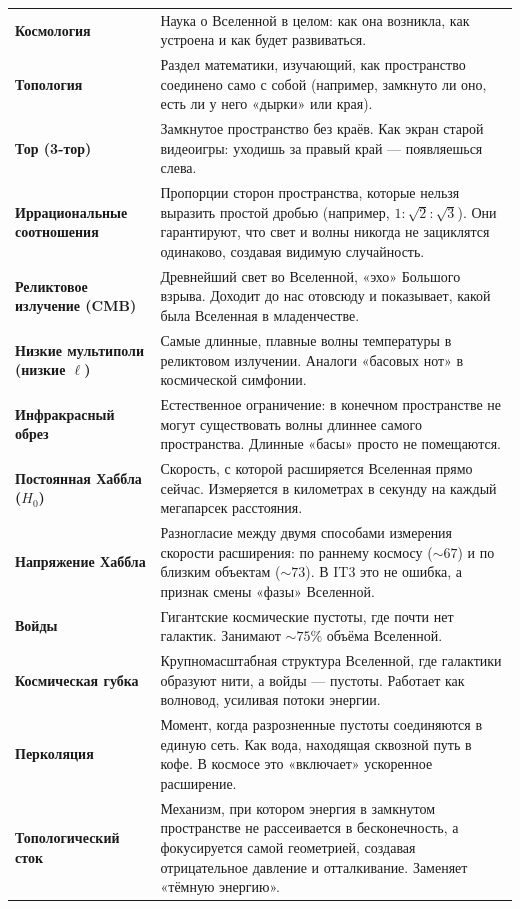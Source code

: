 \documentclass[12pt,a4paper,oneside]{book}
\begin{document}
\begin{longtable}{>{\bfseries}p{3.5cm}p{11cm}}
\textbf{Космология} & Наука о Вселенной в целом: как она возникла, как устроена и как будет развиваться. \\
\textbf{Топология} & Раздел математики, изучающий, как пространство соединено само с собой (например, замкнуто ли оно, есть ли у него «дырки» или края). \\
\textbf{Тор (3-тор)} & Замкнутое пространство без краёв. Как экран старой видеоигры: уходишь за правый край — появляешься слева. \\
\textbf{Иррациональные соотношения} & Пропорции сторон пространства, которые нельзя выразить простой дробью (например, $1:\sqrt{2}:\sqrt{3}$). Они гарантируют, что свет и волны никогда не зациклятся одинаково, создавая видимую случайность. \\
\textbf{Реликтовое излучение (CMB)} & Древнейший свет во Вселенной, «эхо» Большого взрыва. Доходит до нас отовсюду и показывает, какой была Вселенная в младенчестве. \\
\textbf{Низкие мультиполи (низкие $\ell$)} & Самые длинные, плавные волны температуры в реликтовом излучении. Аналоги «басовых нот» в космической симфонии. \\
\textbf{Инфракрасный обрез} & Естественное ограничение: в конечном пространстве не могут существовать волны длиннее самого пространства. Длинные «басы» просто не помещаются. \\
\textbf{Постоянная Хаббла ($H_0$)} & Скорость, с которой расширяется Вселенная прямо сейчас. Измеряется в километрах в секунду на каждый мегапарсек расстояния. \\
\textbf{Напряжение Хаббла} & Разногласие между двумя способами измерения скорости расширения: по раннему космосу ($\sim 67$) и по близким объектам ($\sim 73$). В IT3 это не ошибка, а признак смены «фазы» Вселенной. \\
\textbf{Войды} & Гигантские космические пустоты, где почти нет галактик. Занимают $\sim 75\%$ объёма Вселенной. \\
\textbf{Космическая губка} & Крупномасштабная структура Вселенной, где галактики образуют нити, а войды — пустоты. Работает как волновод, усиливая потоки энергии. \\
\textbf{Перколяция} & Момент, когда разрозненные пустоты соединяются в единую сеть. Как вода, находящая сквозной путь в кофе. В космосе это «включает» ускоренное расширение. \\
\textbf{Топологический сток} & Механизм, при котором энергия в замкнутом пространстве не рассеивается в бесконечность, а фокусируется самой геометрией, создавая отрицательное давление и отталкивание. Заменяет «тёмную энергию». \\

\end{longtable}
\end{document}
